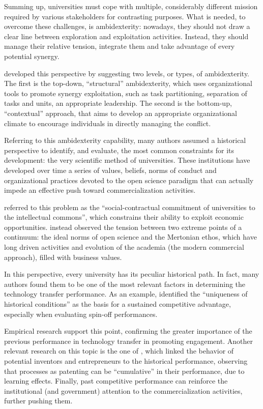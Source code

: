 Summing up, universities must cope with multiple, considerably different mission required by various stakeholders for contrasting purposes. What is needed, to overcome these challenges, is ambidexterity: nowadays, they should not draw a clear line between exploration and exploitation activities. Instead, they should manage their relative tension, integrate them and take advantage of every potential synergy.

\citet{Chang2016} developed this perspective by suggesting two levels, or types, of ambidexterity. The first is the top-down, \enquote{structural} ambidexterity, which uses organizational tools to promote synergy exploitation, such as task partitioning, separation of tasks and units, an appropriate leadership. The second is the bottom-up, \enquote{contextual} approach, that aims to develop an appropriate organizational climate to encourage individuals in directly managing the conflict.

Referring to this ambidexterity capability, many authors assumed a historical perspective to identify, and evaluate, the most common constraints for its development: the very scientific method of universities. These institutions have developed over time a series of values, beliefs, norms of conduct and organizational practices devoted to the open science paradigm that can actually impede an effective push toward commercialization activities. 

\citet{Argyres1998} referred to this problem as the \enquote{social-contractual commitment of universities to the intellectual commons}, which constrains their ability to exploit economic opportunities. \citet{Muscio2013} instead observed the tension between two extreme points of a continuum: the ideal norms of open science and the Mertonian ethos, which have long driven activities and evolution of the academia (the modern commercial approach), filled with business values.

In this perspective, every university has its peculiar historical path. In fact, many authors found them to be one of the most relevant factors in determining the technology transfer performance. As an example, \citet{OShea2005} identified the \enquote{uniqueness of historical conditions} as the basis for a sustained competitive advantage, especially when evaluating spin-off performances. 

Empirical research support this point, confirming the greater importance of the previous performance in technology transfer in promoting engagement. Another relevant research on this topic is the one of \citet{Baldini2006}, which linked the behavior of potential inventors and entrepreneurs to the historical performance, observing that processes as patenting can be \enquote{cumulative} in their performance, due to learning effects. Finally, past competitive performance can reinforce the institutional (and government) attention to the commercialization activities, further pushing them.

